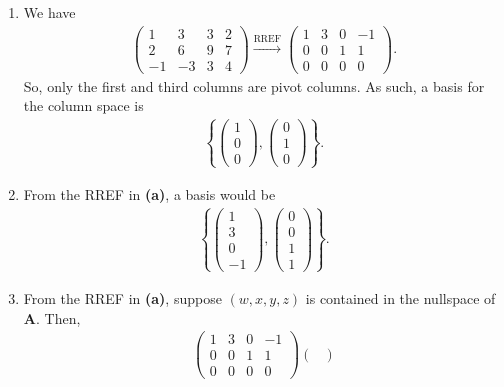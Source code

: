 \documentclass[12pt]{article}
\begin{document}
\begin{enumerate}[label=\textbf{(\alph*)}]
    \itemsep 0em
    \item We have \begin{align*}
    \begin{pmatrix}
    1 & 3 & 3 & 2\\
    2 & 6 & 9 & 7\\
   -1 & -3 & 3 & 4
  \end{pmatrix}\xrightarrow{\text{RREF}}\begin{pmatrix}1&3&0&-1\\ 0&0&1&1\\ 0&0&0&0\end{pmatrix}.
    \end{align*}
    So, only the first and third columns are pivot columns. As such, a basis for the column space is \begin{align*}
        \left\{\begin{pmatrix}
            1\\0\\0
        \end{pmatrix},\begin{pmatrix}
            0\\1\\0
        \end{pmatrix}\right\}.
    \end{align*}
    \item From the RREF in \textbf{(a)}, a basis would be \begin{align*}
        \left\{\begin{pmatrix}
            1\\3\\0\\-1
        \end{pmatrix},\begin{pmatrix}
            0\\0\\1\\1
        \end{pmatrix}\right\}.
    \end{align*}
    \item From the RREF in \textbf{(a)}, suppose $\left(w,x,y,z\right)$ is contained in the nullspace of $\mathbf{A}$. Then, \begin{align*}
        \begin{pmatrix}1&3&0&-1\\ 0&0&1&1\\ 0&0&0&0\end{pmatrix}\begin{pmatrix}

\end{pmatrix}
\end{align*}
\end{enumerate}
\end{document}
